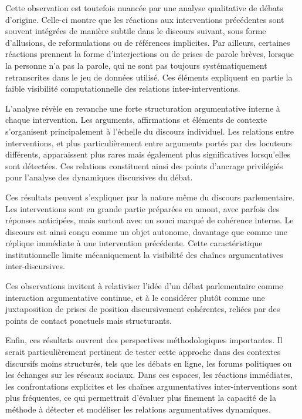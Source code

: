 \documentclass[final, fra]{anthology-ch}      %
\begin{document}
Cette observation est toutefois nuancée par une analyse qualitative de débats d’origine. Celle-ci montre que les réactions aux interventions précédentes sont souvent intégrées de manière subtile dans le discours suivant, sous forme d’allusions, de reformulations ou de références implicites. Par ailleurs, certaines réactions prennent la forme d’interjections ou de prises de parole brèves, lorsque la personne n'a pas la parole, qui ne sont pas toujours systématiquement retranscrites dans le jeu de données utilisé. Ces éléments expliquent en partie la faible visibilité computationnelle des relations inter-interventions.

L’analyse révèle en revanche une forte structuration argumentative interne à chaque intervention. Les arguments, affirmations et éléments de contexte s’organisent principalement à l’échelle du discours individuel. Les relations entre interventions, et plus particulièrement entre arguments portés par des locuteurs différents, apparaissent plus rares mais également plus significatives lorsqu’elles sont détectées. Ces relations constituent ainsi des points d’ancrage privilégiés pour l’analyse des dynamiques discursives du débat.

Ces résultats peuvent s’expliquer par la nature même du discours parlementaire. Les interventions sont en grande partie préparées en amont, avec parfois des réponses anticipées, mais surtout avec un souci marqué de cohérence interne. Le discours est ainsi conçu comme un objet autonome, davantage que comme une réplique immédiate à une intervention précédente. Cette caractéristique institutionnelle limite mécaniquement la visibilité des chaînes argumentatives inter-discursives.

Ces observations invitent à relativiser l’idée d’un débat parlementaire comme interaction argumentative continue, et à le considérer plutôt comme une juxtaposition de prises de position discursivement cohérentes, reliées par des points de contact ponctuels mais structurants.

Enfin, ces résultats ouvrent des perspectives méthodologiques importantes. Il serait particulièrement pertinent de tester cette approche dans des contextes discursifs moins structurés, tels que les débats en ligne, les forums politiques ou les échanges sur les réseaux sociaux. Dans ces espaces, les réactions immédiates, les confrontations explicites et les chaînes argumentatives inter-interventions sont plus fréquentes, ce qui permettrait d’évaluer plus finement la capacité de la méthode à détecter et modéliser les relations argumentatives dynamiques.
\end{document}
